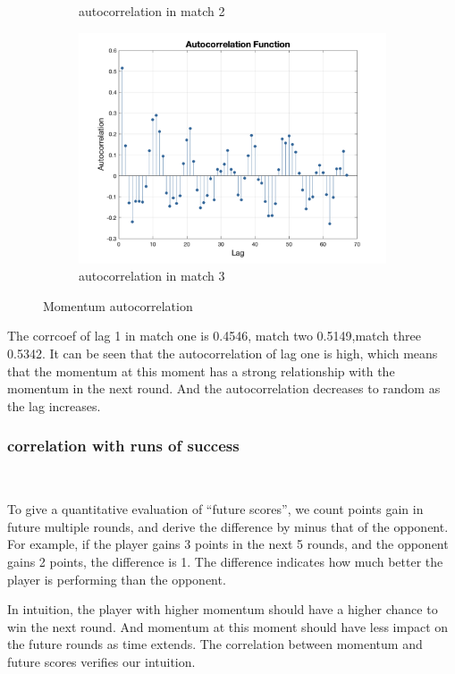 \begin{figure}[H]
\begin{subfigure}[b]{0.34\textwidth}
        \caption{autocorrelation in match 2}
    \end{subfigure}\hspace{-0.02\textwidth}
    \begin{subfigure}[b]{0.34\textwidth}
        \includegraphics[width=\linewidth]{mainmatter/imgs/momen_selfco_3.png}
        \caption{autocorrelation in match 3}
    \end{subfigure}
    \caption{Momentum autocorrelation}
    \label{fig:Correlation}
\end{figure}

The corrcoef of lag 1 in match one is 0.4546, match two 0.5149,match three 0.5342.
It can be seen that the autocorrelation of lag one is high, which means that the momentum at this moment
has a strong relationship with the momentum in the next round. And the autocorrelation decreases to random 
as the lag increases.

\subsubsection{correlation with runs of success}~{}

To give a quantitative evaluation of ``future scores'', we count points gain in future multiple rounds,
and derive the difference by minus that of the opponent. 
For example, if the player gains 3 points in the next 5 rounds, and the opponent gains 2 points,
the difference is 1.
The difference indicates how much better the player is performing than the opponent.

In intuition, the player with higher momentum should have a higher chance to win the next round.
And momentum at this moment should have less impact on the future rounds as time extends.
The correlation between momentum and future scores verifies our intuition.


